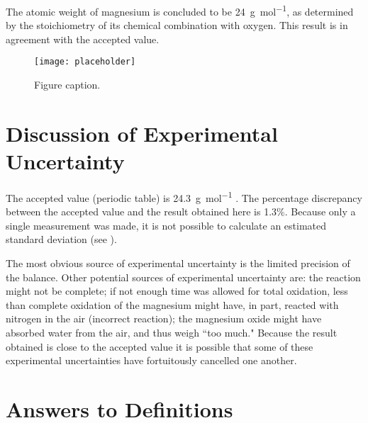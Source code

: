 \documentclass[
	letterpaper, %
	11pt, %
]{CSUniSchoolLabReport}
\begin{document}
The atomic weight of magnesium is concluded to be \SI{24}{\gram\per\mol}, as determined by the stoichiometry of its chemical combination with oxygen. This result is in agreement with the accepted value.

\begin{figure}[H] %
	\centering %
	\texttt{[image: placeholder]} %
	\caption{Figure caption.}
\end{figure}


\section{Discussion of Experimental Uncertainty}

The accepted value (periodic table) is \SI{24.3}{\gram\per\mole} \autocite{Smith:2022qr}. The percentage discrepancy between the accepted value and the result obtained here is 1.3\%. Because only a single measurement was made, it is not possible to calculate an estimated standard deviation (see \textcite{Smith:2021jd}).

The most obvious source of experimental uncertainty is the limited precision of the balance. Other potential sources of experimental uncertainty are: the reaction might not be complete; if not enough time was allowed for total oxidation, less than complete oxidation of the magnesium might have, in part, reacted with nitrogen in the air (incorrect reaction); the magnesium oxide might have absorbed water from the air, and thus weigh ``too much." Because the result obtained is close to the accepted value it is possible that some of these experimental uncertainties have fortuitously cancelled one another.


\section{Answers to Definitions}
\end{document}

